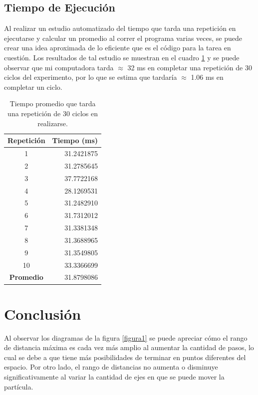 \documentclass{article}
\begin{document}
\newpage

\subsection{Tiempo de Ejecuci\'on}
Al realizar un estudio automatizado del tiempo que tarda una repetici\'on en ejecutarse y calcular un promedio al correr el programa varias veces, se puede crear una idea aproximada de lo eficiente que es el c\'odigo para la tarea en cuesti\'on. Los resultados de tal estudio se muestran en el cuadro \ref{cuadro1} y se puede observar que mi computadora tarda $\approx$ 32 ms en completar una repetici\'on de 30 ciclos del experimento, por lo que se estima que tardar\'ia $\approx$ 1.06 ms en completar un ciclo.

\begin{table}
    \centering
    \caption{Tiempo promedio que tarda una repetici\'on de 30 ciclos en realizarse.}
    \begin{tabular}{|c|r|}
    \hline
        \textbf{Repetici\'on} & \textbf{Tiempo (ms)} \\
    \hline\hline
        1  & 31.2421875 \\
    \hline
        2 & 31.2785645 \\
    \hline
        3 & 37.7722168 \\
    \hline
        4 & 28.1269531 \\
    \hline
        5 & 31.2482910 \\
    \hline
        6 & 31.7312012 \\
    \hline
        7 & 31.3381348 \\
    \hline
        8 & 31.3688965 \\
    \hline
        9 & 31.3549805 \\
    \hline
        10 & 33.3366699 \\
    \hline
        \textbf{Promedio} & 31.8798086 \\
    \hline
    \end{tabular}
    \label{cuadro1}
\end{table}

\section{Conclusi\'on}
Al observar los diagramas de la figura \ref{figura1} se puede apreciar c\'omo el rango de distancia m\'axima es cada vez m\'as amplio al aumentar la cantidad de pasos, lo cual se debe a que tiene m\'as posibilidades de terminar en puntos diferentes del espacio. Por otro lado, el rango de distancias no aumenta o disminuye significativamente al variar la cantidad de ejes en que se puede mover la part\'icula.\\
\end{document}

